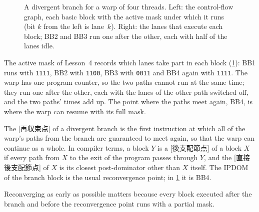 \documentclass[../main.tex]{subfiles}
\begin{document}
\begin{figure}[tb]
  \centering
  
  \caption{A divergent branch for a warp of four threads.  Left: the
    control-flow graph, each basic block with the active mask under
    which it runs (bit $k$ from the left is lane~$k$).  Right: the
    lanes that execute each block; BB2 and BB3 run one after the other,
    each with half of the lanes idle.}
  \label{fig:l06-divergent-cfg}
\end{figure}

The active mask of Lesson~4 records which lanes take part in each block
(\cref{fig:l06-divergent-cfg}): BB1 runs with \texttt{1111}, BB2 with
\texttt{1100}, BB3 with \texttt{0011} and BB4 again with \texttt{1111}.
The warp has one program counter, so the two paths cannot run at the
same time; they run one after the other, each with the lanes of the
other path switched off, and the two paths' times add up.  The point where the paths meet again, BB4, is where
the warp can resume with its full mask.

\begin{definition}
  \label{def:l06-reconvergence}
  The [再収束点] of a divergent branch is the
  first instruction at which all of the warp's paths from the branch are
  guaranteed to meet again, so that the warp can continue as a whole.
  In compiler terms, a block $Y$ is a
  [後支配節点] of a block $X$ if every path from
  $X$ to the exit of the program passes through $Y$, and the
  [直接後支配節点] of $X$ is its
  closest post-dominator other than $X$ itself.  The IPDOM of the
  branch block is the usual reconvergence point; in
  \cref{fig:l06-divergent-cfg} it is BB4.
\end{definition}

%
Reconverging as early as possible matters because every block executed
after the branch and before the reconvergence point runs with a partial
mask.
\end{document}
